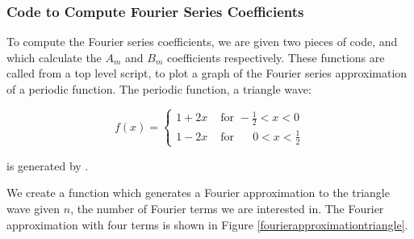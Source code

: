 \documentclass{article}
\begin{document}
\subsubsection{Code to Compute Fourier Series Coefficients}

To compute the Fourier series coefficients, we are given two pieces of code,  and  which calculate the $ A_m $ and $ B_m $ coefficients respectively. These functions are called from a top level script,  to plot a graph of the Fourier series approximation of a periodic function. The periodic function, a triangle wave:


$$
	f(x)=\begin{cases}
	1+2x  &\text{ for } -\frac{1}{2}<  x< 0 \\ 
	1-2x  &\text{ for }  \:\:\:\:\:\:0<  x< \frac{1}{2}  
	\end{cases}
$$



is generated by .

We create a function which generates a Fourier approximation to the triangle wave given $n$, the number of Fourier terms we are interested in. The Fourier approximation with four terms is shown in Figure \ref{fourierapproximationtriangle}. 
\end{document}
